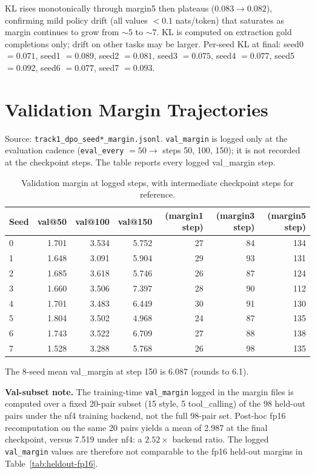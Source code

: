 KL rises monotonically through margin5 then plateaus ($0.083 \to 0.082$), confirming mild policy drift (all values $<0.1$ nats/token) that saturates as margin continues to grow from ${\sim}5$ to ${\sim}7$. KL is computed on extraction gold completions only; drift on other tasks may be larger. Per-seed KL at final: seed0 $=0.071$, seed1 $=0.089$, seed2 $=0.081$, seed3 $=0.075$, seed4 $=0.077$, seed5 $=0.092$, seed6 $=0.077$, seed7 $=0.093$.

\section{Validation Margin Trajectories}
\label{app:valmargin}
Source: \texttt{track1\_dpo\_seed*\_margin.jsonl}. \texttt{val\_margin} is logged only at the evaluation cadence (\texttt{eval\_every} $= 50 \to$ steps 50, 100, 150); it is not recorded at the checkpoint steps. The table reports every logged val\_margin step.

\begin{table}[H]
\centering
\small
\caption{Validation margin at logged steps, with intermediate checkpoint steps for reference.}
\begin{tabular}{@{}lrrrrrr@{}}
\toprule
Seed & val@50 & val@100 & val@150 & (margin1 step) & (margin3 step) & (margin5 step)\\
\midrule
0 & 1.701 & 3.534 & 5.752 & 27 & 84 & 134\\
1 & 1.648 & 3.091 & 5.904 & 29 & 93 & 131\\
2 & 1.685 & 3.618 & 5.746 & 26 & 87 & 124\\
3 & 1.660 & 3.506 & 7.397 & 28 & 90 & 112\\
4 & 1.701 & 3.483 & 6.449 & 30 & 91 & 130\\
5 & 1.804 & 3.502 & 4.968 & 24 & 87 & 135\\
6 & 1.743 & 3.522 & 6.709 & 27 & 88 & 138\\
7 & 1.528 & 3.288 & 5.768 & 26 & 98 & 135\\
\bottomrule
\end{tabular}
\end{table}

The 8-seed mean val\_margin at step 150 is 6.087 (rounds to 6.1).

\textbf{Val-subset note.} The training-time \texttt{val\_margin} logged in the margin files is computed over a fixed 20-pair subset (15 style, 5 tool\_calling) of the 98 held-out pairs under the nf4 training backend, not the full 98-pair set. Post-hoc fp16 recomputation on the same 20 pairs yields a mean of 2.987 at the final checkpoint, versus 7.519 under nf4: a $2.52\times$ backend ratio. The logged \texttt{val\_margin} values are therefore not comparable to the fp16 held-out margins in Table~\ref{tab:heldout-fp16}.
